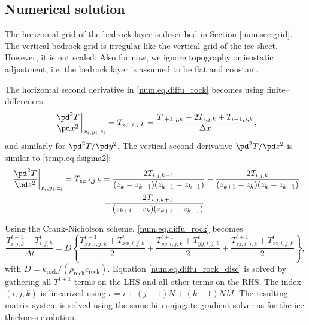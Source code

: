 \subsection{Numerical solution}
The horizontal grid of the bedrock layer is described in Section \ref{num.sec.grid}. The vertical bedrock grid is irregular like the vertical grid of the ice sheet. However, it is not scaled. Also for now, we ignore topography or isostatic adjustment, i.e. the bedrock layer is assumed to be flat and constant.

The horizontal second derivative in \eqref{num.eq.diffu_rock} becomes using finite--differences
\begin{equation}
  \left.\frac{\pd^2T}{\pd x^2}\right|_{x_i,y_i,z_i} = T_{xx,i,j,k} = \frac{T_{i+1,j,k}-2T_{i,j,k}+T_{i-1,j,k}}{\Delta x},
\end{equation}
and similarly for $\pd^2T/\pd y^2$. The vertical second derivative $\pd^2T/\pd z^2$ is similar to \eqref{temp.eq.dsigma2}:
\begin{multline}
  \left.\frac{\pd^2 T}{\pd z^2}\right|_{x_i,y_i,z_i} = T_{zz,i,j,k} = \frac{2T_{i,j,k-1}}{(z_k-z_{k-1})(z_{k+1}-z_{k-1})} - \frac{2T_{i,j,k}}{(z_{k+1}-z_k)(z_k-z_{k-1})}\\
  + \frac{2T_{i,j,k+1}}{(z_{k+1}-z_k)(z_{k+1}-z_{k-1})}.
\end{multline}

\noindent
Using the Crank-Nicholson scheme, \eqref{num.eq.diffu_rock} becomes
\begin{equation}
  \label{num.eq.diffu_rock_disc}
  \frac{T_{i,j,k}^{t+1}-T_{i,j,k}^{t}}{\Delta t}=D\left\{\frac{T_{xx,i,j,k}^{t+1}+T_{xx,i,j,k}^{t}}2 + \frac{T_{yy,i,j,k}^{t+1}+T_{yy,i,j,k}^{t}}2 + \frac{T_{zz,i,j,k}^{t+1}+T_{zz,i,j,k}^{t}}2 \right\},
\end{equation}
with $D=k_{\text{rock}}/(\rho_{\text{rock}}c_{\text{rock}})$. Equation \eqref{num.eq.diffu_rock_disc} is solved by gathering all $T^{t+1}$ terms on the LHS and all other terms on the RHS. The index $(i,j,k)$ is linearized using $\iota = i+(j-1)N+(k-1)NM$. The resulting matrix system is solved using the same bi--conjugate gradient solver as for the ice thickness evolution.

